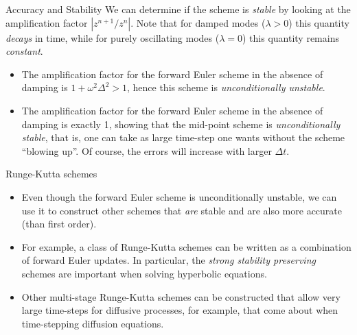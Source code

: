 \documentclass[pdf]{beamer}
\theoremstyle{definition}
\begin{document}
\begin{frame}{Accuracy and Stability}
  We can determine if the scheme is \emph{stable} by looking at the
  amplification factor $| z^{n+1}/z^n|$. Note that for damped modes
  ($\lambda>0$) this quantity \emph{decays} in time, while for purely
  oscillating modes ($\lambda = 0$) this quantity remains
  \emph{constant}.

  
  \begin{itemize}
  \item The amplification factor for the forward Euler scheme in the
    absence of damping is $1+\omega^2\Delta^2 > 1$, hence this scheme
    is \emph{unconditionally unstable}.
  \item The amplification factor for the forward Euler scheme in the
    absence of damping is exactly 1, showing that the mid-point scheme
    is \emph{unconditionally stable}, that is, one can take as large
    time-step one wants without the scheme ``blowing up''. Of course,
    the errors will increase with larger $\Delta t$.
  \end{itemize}
\end{frame}

\begin{frame}{Runge-Kutta schemes}
  \begin{itemize}
  \item Even though the forward Euler scheme is unconditionally
    unstable, we can use it to construct other schemes that \emph{are}
    stable and are also more accurate (than first order).
  \item For example, a class of Runge-Kutta schemes can be written as
    a combination of forward Euler updates. In particular, the
    \emph{strong stability preserving} schemes are important when
    solving hyperbolic equations.
  \item Other multi-stage Runge-Kutta schemes can be constructed that
    allow very large time-steps for diffusive processes, for example,
    that come about when time-stepping diffusion equations.
  \end{itemize}
\end{frame}
\end{document}
